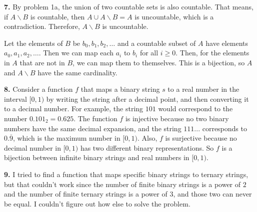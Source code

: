 \documentclass{article}
\begin{document}
\textbf{7.} By problem 1a, the union of two countable sets is also countable. That means, if $A\backslash B$ is countable, then $A \cup A\backslash B = A$ is uncountable, which is a contradiction. Therefore, $A\backslash B$ is uncountable.
\newline

Let the elements of $B$ be $b_0, b_1, b_2, \ldots$ and a countable subset of $A$ have elements $a_0, a_1, a_2, \ldots$. Then we can map each $a_i$ to $b_i$ for all $i \ge 0$. Then, for the elements in $A$ that are not in $B$, we can map them to themselves. This is a bijection, so $A$ and $A \backslash B$ have the same cardinality.
\newline

\textbf{8.} Consider a function $f$ that maps a binary string $s$ to a real number in the interval $[0, 1)$ by writing the string after a decimal point, and then converting it to a decimal number. For example, the string $101$ would correspond to the number $0.101_2 = 0.625$. The function $f$ is injective because no two binary numbers have the same decimal expansion, and the string $111...$ corresponds to $0.\overline{9}$, which is the maximum number in $[0, 1)$. Also, $f$ is surjective because no decimal number in $[0, 1)$ has two different binary representations. So $f$ is a bijection between infinite binary strings and real numbers in $[0, 1)$.
\newline

\textbf{9.} I tried to find a function that maps specific binary strings to ternary strings, but that couldn't work since the number of finite binary strings is a power of $2$ and the number of finite ternary strings is a power of $3$, and those two can never be equal. I couldn't figure out how else to solve the problem.
\end{document}
